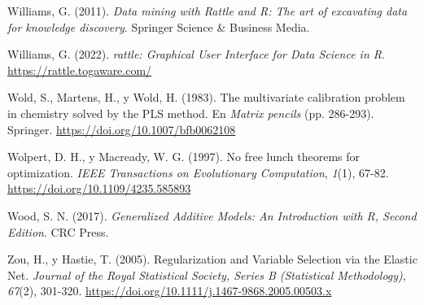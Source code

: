 \documentclass[
]{book}
\newlength{\cslhangindent}
\newlength{\cslentryspacingunit} %
\newenvironment{CSLReferences}[2] %
 {%
  \setlength{\parindent}{0pt}
  \ifodd #1
  \let\oldpar\par
  \def\par{\hangindent=\cslhangindent\oldpar}
  \fi
  \setlength{\parskip}{#2\cslentryspacingunit}
 }%
 {}
\theoremstyle{break}
\theoremstyle{nonumberplain}
\begin{document}
\begin{CSLReferences}{1}{0}
\leavevmode{}%
Williams, G. (2011). \emph{Data mining with Rattle and R: The art of excavating data for knowledge discovery}. Springer Science \& Business Media.

\leavevmode{}%
Williams, G. (2022). \emph{rattle: Graphical User Interface for Data Science in R}. \url{https://rattle.togaware.com/}

\leavevmode{}%
Wold, S., Martens, H., y Wold, H. (1983). The multivariate calibration problem in chemistry solved by the PLS method. En \emph{Matrix pencils} (pp. 286-293). Springer. \url{https://doi.org/10.1007/bfb0062108}

\leavevmode{}%
Wolpert, D. H., y Macready, W. G. (1997). No free lunch theorems for optimization. \emph{IEEE Transactions on Evolutionary Computation}, \emph{1}(1), 67-82. \url{https://doi.org/10.1109/4235.585893}

\leavevmode{}%
Wood, S. N. (2017). \emph{Generalized Additive Models: An Introduction with R, Second Edition}. CRC Press.

\leavevmode{}%
Zou, H., y Hastie, T. (2005). Regularization and Variable Selection via the Elastic Net. \emph{Journal of the Royal Statistical Society, Series B (Statistical Methodology)}, \emph{67}(2), 301-320. \url{https://doi.org/10.1111/j.1467-9868.2005.00503.x}

\end{CSLReferences}
\end{document}
